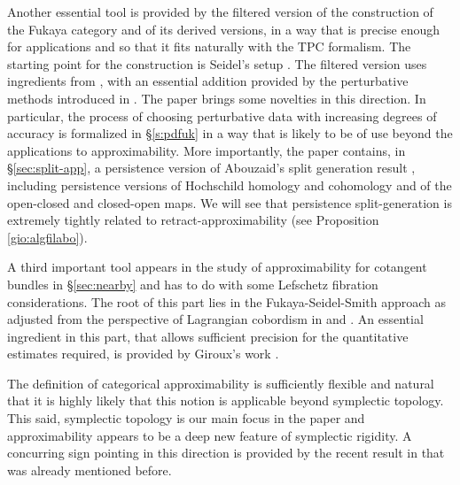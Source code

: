 Another essential tool is provided by the filtered version of the construction of the Fukaya category and of its derived versions, in a way that is precise enough for applications and so that it fits naturally  with the TPC formalism. The starting point for the construction is Seidel's setup \cite{Se:book-fukaya-categ}. The filtered version uses ingredients from 
\cite{Bi-Co-Sh:LagrSh}, \cite{BCZ:tpc} with an essential addition provided by the perturbative methods introduced in \cite{Amb:fil-fuk}. The paper brings some novelties
in this direction. In particular,  the process of choosing perturbative data with increasing degrees of accuracy is formalized in \S\ref{s:pdfuk} in a way that is likely to be of use beyond the applications to approximability. More importantly, the paper contains, in \S\ref{sec:split-app}, a persistence version of Abouzaid's split generation result \cite{Ab:geom-crit}, including persistence versions of Hochschild homology and cohomology and of the open-closed and closed-open maps. We will see that persistence split-generation is  extremely tightly related to retract-approximability (see Proposition \ref{gio:algfilabo}).

A third important tool appears in the study of approximability for cotangent bundles in \S\ref{sec:nearby} and has 
to do with some Lefschetz fibration considerations. The root of this part lies in the Fukaya-Seidel-Smith approach \cite{FSS:ex} as adjusted from the perspective  of Lagrangian cobordism in \cite{Bi-Co:lefcob-pub} and \cite{Bi-Co:mspectral}. An essential  ingredient in this part, that allows sufficient precision for the quantitative estimates required,
is provided by Giroux's work \cite{Gir:Lef-cot}.

The definition of categorical approximability  is sufficiently flexible and natural that it is highly likely that this notion is applicable beyond symplectic topology.  This said,
symplectic topology is our main focus in the paper and approximability appears to be a deep new feature of symplectic rigidity.  A concurring sign pointing in this direction is provided by 
the recent result in \cite{Gu-Vi-Zh:approx} that was already mentioned before.

